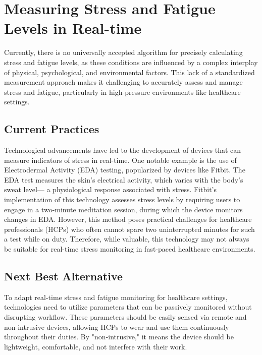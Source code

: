 \section{Measuring Stress and Fatigue Levels in Real-time}
Currently, there is no universally accepted algorithm for precisely calculating stress and fatigue levels, as these conditions are influenced by a complex interplay of physical, psychological, and environmental factors. This lack of a standardized measurement approach makes it challenging to accurately assess and manage stress and fatigue, particularly in high-pressure environments like healthcare settings.


\subsection{Current Practices}
Technological advancements have led to the development of devices that can measure indicators of stress in real-time. One notable example is the use of Electrodermal Activity (EDA) testing, popularized by devices like Fitbit. The EDA test measures the skin's electrical activity, which varies with the body’s sweat level— a physiological response associated with stress. Fitbit's implementation of this technology assesses stress levels by requiring users to engage in a two-minute meditation session, during which the device monitors changes in EDA. \cite{49} However, this method poses practical challenges for healthcare professionals (HCPs) who often cannot spare two uninterrupted minutes for such a test while on duty. Therefore, while valuable, this technology may not always be suitable for real-time stress monitoring in fast-paced healthcare environments.


\subsection{Next Best Alternative}
To adapt real-time stress and fatigue monitoring for healthcare settings, technologies need to utilize parameters that can be passively monitored without disrupting workflow. These parameters should be easily sensed via remote and non-intrusive devices, allowing HCPs to wear and use them continuously throughout their duties. By "non-intrusive," it means the device should be lightweight, comfortable, and not interfere with their work. \\

